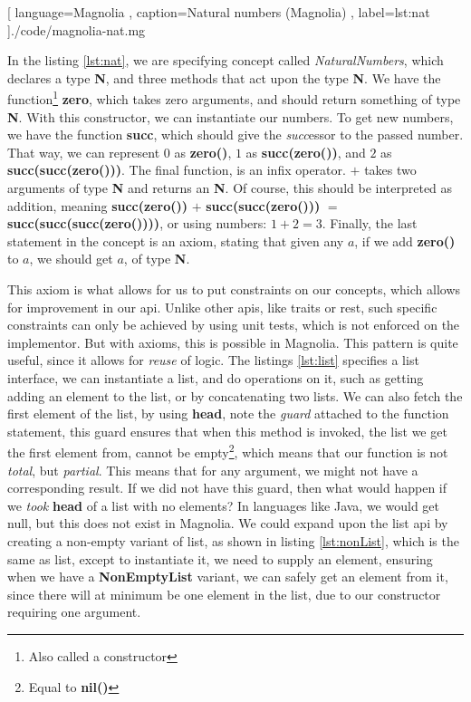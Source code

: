 \begin{center}
  
    [ language=Magnolia
    , caption={Natural numbers (Magnolia)}
    , label=lst:nat
    ]{./code/magnolia-nat.mg}
\end{center}

In the listing \ref{lst:nat}, we are specifying concept called
\textit{NaturalNumbers}, which declares a type \textbf{N}, and three methods
that act upon the type \textbf{N}. We have the function\footnote{Also called a constructor}
\textbf{zero}, which takes zero arguments, and should return something of type
\textbf{N}. With this constructor, we can instantiate our numbers. To get new
numbers, we have the function \textbf{succ}, which should give the
\textit{succ}essor to the passed number. That way, we can represent $0$ as
\textbf{zero()}, $1$ as \textbf{succ(zero())}, and $2$ as
\textbf{succ(succ(zero()))}. The final function, is an infix operator. $+$ takes
two arguments of type \textbf{N} and returns an \textbf{N}. Of course, this
should be interpreted as addition, meaning \textbf{succ(zero())} $+$
\textbf{succ(succ(zero()))} $=$ \textbf{succ(succ(succ(zero())))}, or using
numbers: $1 + 2 = 3$. Finally, the last statement in the concept is an axiom,
stating that given any $a$, if we add \textbf{zero()} to $a$, we should get $a$,
of type \textbf{N}.

This axiom is what allows for us to put constraints on our concepts, which
allows for improvement in our \gls*{api}. Unlike other \gls*{api}s, like traits or
\gls*{rest}, such specific constraints can only be achieved by using unit tests,
which is not enforced on the implementor. But with axioms, this is possible in
Magnolia. This pattern is quite useful, since it allows for \textit{reuse} of
logic. The listings \ref{lst:list} specifies a list interface, we can
instantiate a list, and do operations on it, such as getting adding an element to
the list, or by concatenating two lists. We can also fetch the first element of
the list, by using \textbf{head}, note the \textit{guard} attached to the
function statement, this guard ensures that when this method is invoked, the
list we get the first element from, cannot be empty\footnote{Equal to \textbf{nil()}},
which means that our function is not \textit{total}, but \textit{partial}. This
means that for any argument, we might not have a corresponding result. If we did
not have this guard, then what would happen if we \textit{took} \textbf{head} of a list
with no elements? In languages like Java, we would get null, but this does not
exist in Magnolia. We could expand upon the list \gls*{api} by creating a
non-empty variant of list, as shown in listing \ref{lst:nonList}, which is the
same as list, except to instantiate it, we need to supply an element, ensuring
when we have a \textbf{NonEmptyList} variant, we can safely get an element from
it, since there will at minimum be one element in the list, due to our
constructor requiring one argument.

